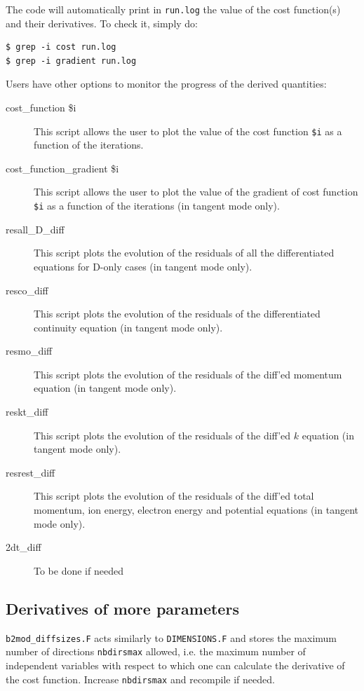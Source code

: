 The code will automatically print in {\tt run.log} the value of the cost function(s) and their derivatives. To check it, simply do:
\begin{verbatim}
$ grep -i cost run.log
$ grep -i gradient run.log
\end{verbatim}

Users have other options to monitor the progress of the derived quantities:
\begin{description}
  \item[cost\_function \$i] This script allows the user to plot the value of the cost function {\tt \$i} as a function of the iterations.
  \item[cost\_function\_gradient \$i] This script allows the user to plot the value of the gradient of cost function {\tt \$i} as a function of the iterations (in tangent mode only).
  \item[resall\_D\_diff] This script plots the evolution of the residuals of all the differentiated equations for D-only cases (in tangent mode only).
  \item[resco\_diff] This script plots the evolution of the residuals of the differentiated continuity equation (in tangent mode only).
  \item[resmo\_diff] This script plots the evolution of the residuals of the diff'ed momentum equation (in tangent mode only).
  \item[reskt\_diff] This script plots the evolution of the residuals of the diff'ed $k$ equation (in tangent mode only).
  \item[resrest\_diff] This script plots the evolution of the residuals of the diff'ed total momentum, ion energy, electron energy and potential equations (in tangent mode only).
  \item[2dt\_diff] To be done if needed
\end{description}

\subsection{Derivatives of more parameters}\label{sec:tanget_more}

{\tt b2mod\_diffsizes.F} acts similarly to {\tt DIMENSIONS.F} and stores the maximum number of directions {\tt nbdirsmax} allowed, i.e. the maximum number of independent variables with respect to which one can calculate the derivative of the cost function. Increase {\tt nbdirsmax} and recompile if needed.


